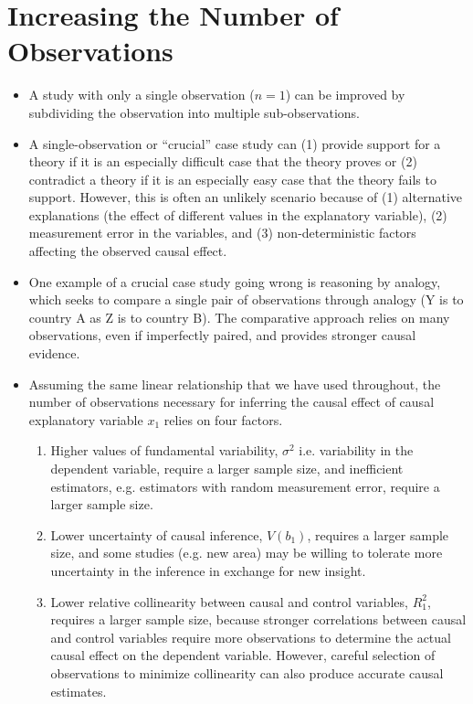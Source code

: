 \documentclass[11pt,letterpaper]{article}
\begin{document}
\section{Increasing the Number of Observations}

\begin{itemize}
\item A study with only a single observation ($n=1$) can be improved by subdividing the observation into multiple sub-observations.
\item A single-observation or ``crucial'' case study can (1) provide support for a theory if it is an especially difficult case that the theory proves or (2) contradict a theory if it is an especially easy case that the theory fails to support. However, this is often an unlikely scenario because of (1) alternative explanations (the effect of different values in the explanatory variable), (2) measurement error in the variables, and (3) non-deterministic factors affecting the observed causal effect.
\item One example of a crucial case study going wrong is reasoning by analogy, which seeks to compare a single pair of observations through analogy (Y is to country A as Z is to country B). The comparative approach relies on many observations, even if imperfectly paired, and provides stronger causal evidence.
\item Assuming the same linear relationship that we have used throughout, the number of observations necessary for inferring the causal effect of causal explanatory variable $x_{1}$ relies on four factors.
\begin{enumerate}
\item Higher values of fundamental variability, $\sigma^{2}$ i.e. variability in the dependent variable, require a larger sample size, and inefficient estimators, e.g. estimators with random measurement error, require a larger sample size.
\item Lower uncertainty of causal inference, $V(b_{1})$, requires a larger sample size, and some studies (e.g. new area) may be willing to tolerate more uncertainty in the inference in exchange for new insight. 
\item Lower relative collinearity between causal and control variables, $R^{2}_{1}$, requires a larger sample size, because stronger correlations between causal and control variables require more observations to determine the actual causal effect on the dependent variable. However, careful selection of observations to minimize collinearity can also produce accurate causal estimates. 

\end{enumerate}
\end{itemize}
\end{document}
